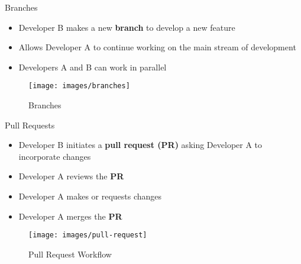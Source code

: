 \documentclass[
  ignorenonframetext,
]{beamer}
\providecommand{\tightlist}{%
  \setlength{\itemsep}{0pt}\setlength{\parskip}{0pt}}
\begin{document}
\begin{frame}{Branches}
\protect\hypertarget{branches}{}
\begin{itemize}
\tightlist
\item
  Developer B makes a new \textbf{branch} to develop a new feature
\item
  Allows Developer A to continue working on the main stream of
  development
\item
  Developers A and B can work in parallel
\end{itemize}

\begin{figure}

{\centering \texttt{[image: images/branches]} 

}

\caption{Branches}\label{fig:unnamed-chunk-9}
\end{figure}
\end{frame}

\begin{frame}{Pull Requests}
\protect\hypertarget{pull-requests}{}
\begin{itemize}
\tightlist
\item
  Developer B initiates a \textbf{pull request (PR) } asking Developer A
  to incorporate changes
\item
  Developer A reviews the \textbf{PR}
\item
  Developer A makes or requests changes
\item
  Developer A merges the \textbf{PR}
\end{itemize}

\begin{figure}

{\centering \texttt{[image: images/pull-request]} 

}

\caption{Pull Request Workflow}\label{fig:unnamed-chunk-10}
\end{figure}
\end{frame}
\end{document}
